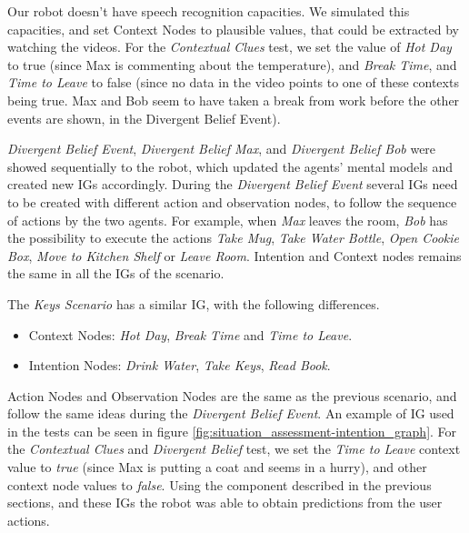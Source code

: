 Our robot doesn't have speech recognition capacities. We simulated this capacities, and set Context Nodes to plausible values, that could be extracted by watching the videos. For the \textit{Contextual Clues} test, we set the value of \textit{Hot Day} to true (since Max is commenting about the temperature), and \textit{Break Time}, and \textit{Time to Leave} to false (since no data in the video points to one of these contexts being true. Max and Bob seem to have taken a break from work before the other events are shown, in the Divergent Belief Event).

\textit{Divergent Belief Event}, \textit{Divergent Belief Max}, and \textit{Divergent Belief Bob} were showed sequentially to the robot, which updated the agents' mental models and created new IGs accordingly. During the \textit{Divergent Belief Event} several IGs need to be created with different action and observation nodes, to follow the sequence of actions by the two agents. For example, when \textit{Max} leaves the room, \textit{Bob} has the possibility to execute the actions \textit{Take Mug}, \textit{Take Water Bottle}, \textit{Open Cookie Box}, \textit{Move to Kitchen Shelf} or \textit{Leave Room}. Intention and Context nodes remains the same in all the IGs of the scenario.


The \textit{Keys Scenario} has a similar IG, with the following differences.
\begin{itemize}
\item Context Nodes: \textit{Hot Day}, \textit{Break Time} and \textit{Time to Leave}.
\item Intention Nodes: \textit{Drink Water}, \textit{Take Keys}, \textit{Read Book}.
\end{itemize}

Action Nodes and Observation Nodes are the same as the previous scenario, and follow the same ideas during the \textit{Divergent Belief Event}. An example of IG used in the tests can be seen in figure \ref{fig:situation_assessment-intention_graph}. For the \textit{Contextual Clues} and \textit{Divergent Belief} test, we set the \textit{Time to Leave} context value to \textit{true} (since Max is putting a coat and seems in a hurry), and other context node values to \textit{false}. Using the component described in the previous sections, and these IGs the robot was able to obtain predictions from the user actions.

